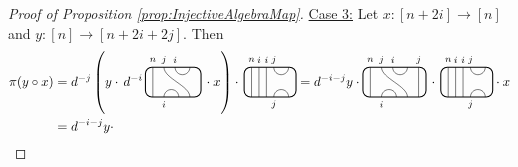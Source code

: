 \documentclass[11pt]{article}
\theoremstyle{plain}
\theoremstyle{definition}
\begin{document}
\begin{proof}[Proof of Proposition \ref{prop:InjectiveAlgebraMap}]
\item[\underline{Case 3:}]
Let $x:[n+2i]\rightarrow [n]$ and $y:[n]\to [n+2i+2j]$.
Then
\begin{align*}
 \pi(y\circ x) 
 &= 
 d^{-j}\left(
 y\cdot\,
d^{-i}\,
\begin{tikzpicture}[baseline = .3cm]
 \draw[thick, rounded corners = 5pt] (0,0) rectangle (1.5,.8);
 \draw (.2,0) -- (.2,.8);
 \draw (.8,.8) arc (-180:0:.2cm);
 \draw (1.2,0) .. controls ++(90:.3cm) and ++(270:.3cm) .. (.5,.8);
 \draw (.5,0) arc (180:0:.2cm);
 \node at (.2,1) {\scriptsize{$n$}};
 \node at (.5,1) {\scriptsize{$j$}};
 \node at (.8,1) {\scriptsize{$i$}};
 \node at (.5,-.2) {\scriptsize{$i$}};
\end{tikzpicture}
 \,\cdot x 
 \right)
 \cdot\,
 \begin{tikzpicture}[baseline=.3cm]
  \draw (.2,0) -- (.2,.8);
  \node at (.2,1) {\scriptsize{$n$}};
  \draw (.4,0) -- (.4,.8);
  \node at (.4,1) {\scriptsize{$i$}};
  \draw (.6,0) -- (.6,.8);
  \node at (.6,1) {\scriptsize{$i$}};
  \draw (.8,0) arc (180:0:.2cm);
  \node at (.8,-.2) {\scriptsize{$j$}};
  \draw (.8,.8) arc (-180:0:.2cm);
  \node at (.8,1) {\scriptsize{$j$}};
  \draw[thick, rounded corners = 5pt] (0,0) rectangle (1.4,.8);
 \end{tikzpicture}
 =
 d^{-i-j}
 y\cdot
\begin{tikzpicture}[baseline = .3cm]
 \draw[thick, rounded corners = 5pt] (0,0) rectangle (1.7,.8);
 \draw (.2,0) -- (.2,.8);
 \draw (.8,.8) arc (-180:0:.2cm);
 \draw (1.2,0) .. controls ++(90:.3cm) and ++(270:.3cm) .. (.5,.8);
 \draw (.5,0) arc (180:0:.2cm);
 \draw (1.5,0) -- (1.5,.8);
 \node at (.2,1) {\scriptsize{$n$}};
 \node at (.5,1) {\scriptsize{$j$}};
 \node at (.8,1) {\scriptsize{$i$}};
 \node at (.5,-.2) {\scriptsize{$i$}};
 \node at (1.5,1) {\scriptsize{$j$}};
\end{tikzpicture}
\,\cdot\,
 \begin{tikzpicture}[baseline=.3cm]
  \draw (.2,0) -- (.2,.8);
  \node at (.2,1) {\scriptsize{$n$}};
  \draw (.4,0) -- (.4,.8);
  \node at (.4,1) {\scriptsize{$i$}};
  \draw (.6,0) -- (.6,.8);
  \node at (.6,1) {\scriptsize{$i$}};
  \draw (.8,0) arc (180:0:.2cm);
  \node at (.8,-.2) {\scriptsize{$j$}};
  \draw (.8,.8) arc (-180:0:.2cm);
  \node at (.8,1) {\scriptsize{$j$}};
  \draw[thick, rounded corners = 5pt] (0,0) rectangle (1.4,.8);
 \end{tikzpicture}
\cdot x 
\\&= 
d^{-i-j}
y\cdot\, 

\end{align*}
\end{proof}
\end{document}
